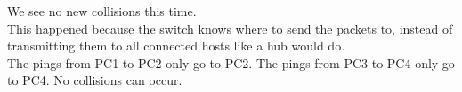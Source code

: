 We see no new collisions this time. \\
This happened because the switch knows where to send the packets to,
instead of transmitting them to all connected hosts like a hub would do. \\
The pings from PC1 to PC2 only go to PC2. The pings from PC3 to PC4 only go to PC4.
No collisions can occur.
